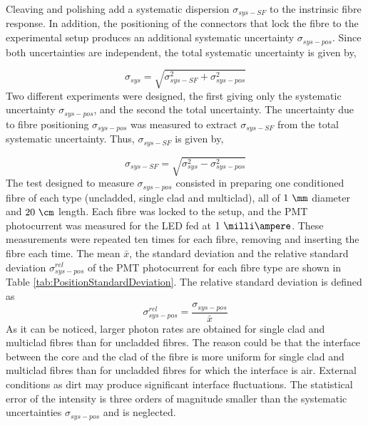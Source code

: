 Cleaving and polishing add a systematic dispersion $\sigma_{sys-SF}$ to the instrinsic fibre response. In addition, the positioning of the connectors that lock the fibre to the experimental setup produces an additional systematic uncertainty $\sigma_{sys-pos}$. Since both uncertainties are independent, the total systematic uncertainty is given by,

\begin{equation}
\sigma_{sys} = \sqrt{\sigma^2_{sys-SF} + \sigma^2_{sys-pos} }
\label{eq:TotalUncertaintyFiberCharacterization}
\end{equation}
Two different experiments were designed, the first giving only the systematic uncertainty $\sigma_{sys-pos}$, and the second the total uncertainty. The uncertainty due to fibre positioning $\sigma_{sys-pos}$ was measured to extract $\sigma_{sys-SF}$ from the total systematic uncertainty. Thus, $\sigma_{sys-SF}$ is given by,

\begin{equation}
\sigma_{sys-SF} = \sqrt{\sigma^2_{sys} - \sigma^2_{sys-pos} }
\label{eq:TMUncertaintyFiberCharacterization}
\end{equation}
The test designed to measure $\sigma_{sys-pos}$ consisted in preparing one conditioned fibre of each type (uncladded, single clad and multiclad), all of $1~\mm$ diameter and $20~\cm$ length. Each fibre was locked to the setup, and the PMT photocurrent was measured for the LED fed at $1~\milli\ampere$. These measurements were repeated ten times for each fibre, removing and inserting the fibre each time. The mean $\bar{x}$, the standard deviation  and the relative standard deviation $\sigma^{rel}_{sys-pos}$
of the PMT photocurrent for each fibre type are shown in Table \ref{tab:PositionStandardDeviation}. The relative standard deviation is defined as
\begin{equation}
\sigma^{rel}_{sys-pos} = \frac{\sigma_{sys-pos}}{\bar{x}}
\label{eq:RelativeStandardDesviation}
\end{equation}
As it can be noticed, larger photon rates are obtained for single clad and multiclad fibres than for uncladded fibres. The reason could be that the interface between the core and the clad of the fibre is more uniform for single clad and multiclad fibres than for uncladded fibres for which the interface is air. External conditions as dirt may produce significant interface fluctuations. The statistical error of the intensity is three orders of magnitude smaller than the systematic uncertainties $\sigma_{sys-pos}$ and is neglected.

